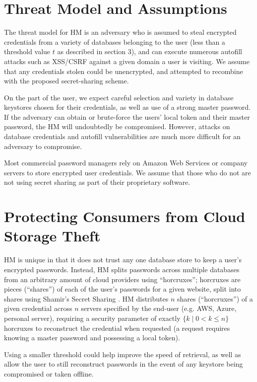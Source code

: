 \documentclass[conference]{IEEEtran}
\begin{document}

\section{Threat Model and Assumptions}
The threat model for HM is an adversary who is assumed to steal encrypted
credentials from a variety of databases belonging to the user (less than a
threshold value $t$ as described in section 3), and can execute numerous
autofill attacks such as XSS/CSRF against a given domain a user is visiting. 
We assume that any credentials stolen could be unencrypted, and attempted to
recombine with the proposed secret-sharing scheme.

On the part of the user, we expect careful selection and variety in database
keystores chosen for their credentials, as well as use of a strong master password.
If the adversary can obtain or brute-force the users' local token and their
master password, the HM will undoubtedly be compromised. However, attacks on
database credentials and autofill vulnerabilities are much more difficult for an
adversary to compromise.

Most commercial password managers rely on Amazon Web Services or company servers 
to store encrypted user credentials. We assume that those who do not are not
using secret sharing as part of their proprietary software.

\section{Protecting Consumers from Cloud Storage Theft}
HM is unique in that it does not trust any one database store to keep a user's
encrypted passwords. Instead, HM splits passwords across multiple databases from
an arbitrary amount of cloud providers using ``horcruxes''; horcruxes are pieces
(``shares'') of each of the user's passwords for a given website, split into
shares using Shamir's Secret Sharing \cite{shamir1979share}. HM distributes $n$
shares (``horcruxes'') of a given credential across $n$ servers specified by the
end-user (e.g. AWS, Azure, personal server), requiring a security parameter of
exactly $\{k \mid 0 < k\leq n\}$ horcruxes to reconstruct the credential when
requested (a request requires knowing a master password and possessing a local
token). 

Using a smaller threshold could help improve the speed of retrieval, as well as
allow the user to still reconstruct passwords in the event of any keystore being
compromised or taken offline.
\end{document}

